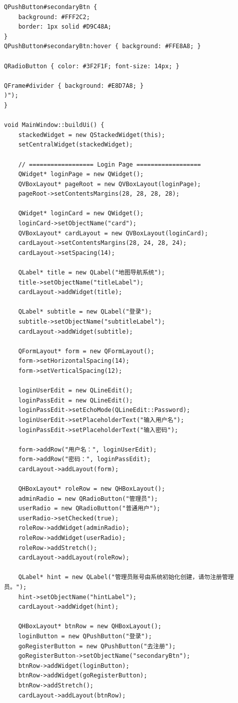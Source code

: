 \documentclass[UTF8,12pt,a4paper]{ctexart}
\begin{document}
\begin{lstlisting}[caption={mainwindow.cpp 源码}]
QPushButton#secondaryBtn {
    background: #FFF2C2;
    border: 1px solid #D9C48A;
}
QPushButton#secondaryBtn:hover { background: #FFE8A8; }

QRadioButton { color: #3F2F1F; font-size: 14px; }

QFrame#divider { background: #E8D7A8; }
)");
}

void MainWindow::buildUi() {
    stackedWidget = new QStackedWidget(this);
    setCentralWidget(stackedWidget);

    // ================== Login Page ==================
    QWidget* loginPage = new QWidget();
    QVBoxLayout* pageRoot = new QVBoxLayout(loginPage);
    pageRoot->setContentsMargins(28, 28, 28, 28);

    QWidget* loginCard = new QWidget();
    loginCard->setObjectName("card");
    QVBoxLayout* cardLayout = new QVBoxLayout(loginCard);
    cardLayout->setContentsMargins(28, 24, 28, 24);
    cardLayout->setSpacing(14);

    QLabel* title = new QLabel("地图导航系统");
    title->setObjectName("titleLabel");
    cardLayout->addWidget(title);

    QLabel* subtitle = new QLabel("登录");
    subtitle->setObjectName("subtitleLabel");
    cardLayout->addWidget(subtitle);

    QFormLayout* form = new QFormLayout();
    form->setHorizontalSpacing(14);
    form->setVerticalSpacing(12);

    loginUserEdit = new QLineEdit();
    loginPassEdit = new QLineEdit();
    loginPassEdit->setEchoMode(QLineEdit::Password);
    loginUserEdit->setPlaceholderText("输入用户名");
    loginPassEdit->setPlaceholderText("输入密码");

    form->addRow("用户名：", loginUserEdit);
    form->addRow("密码：", loginPassEdit);
    cardLayout->addLayout(form);

    QHBoxLayout* roleRow = new QHBoxLayout();
    adminRadio = new QRadioButton("管理员");
    userRadio = new QRadioButton("普通用户");
    userRadio->setChecked(true);
    roleRow->addWidget(adminRadio);
    roleRow->addWidget(userRadio);
    roleRow->addStretch();
    cardLayout->addLayout(roleRow);

    QLabel* hint = new QLabel("管理员账号由系统初始化创建，请勿注册管理员。");
    hint->setObjectName("hintLabel");
    cardLayout->addWidget(hint);

    QHBoxLayout* btnRow = new QHBoxLayout();
    loginButton = new QPushButton("登录");
    goRegisterButton = new QPushButton("去注册");
    goRegisterButton->setObjectName("secondaryBtn");
    btnRow->addWidget(loginButton);
    btnRow->addWidget(goRegisterButton);
    btnRow->addStretch();
    cardLayout->addLayout(btnRow);


\end{lstlisting}
\end{document}
